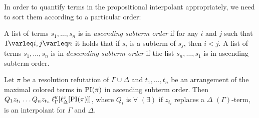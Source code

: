 In order to quantify terms in the propositional interpolant appropriately, we need to sort them according to a particular order:

\begin{defi}
	A list of terms $s_1, \dots, s_n$ is in \emph{ascending subterm order} if for any
	$i$ and $j$ such that  $1\varleq i,j \varleq n$ it holds that if  $s_i$ is a subterm of $s_j$, then $i<j$.
	A list of terms $s_1, \dots, s_n$ is in \emph{descending subterm order} if the list $s_n, \dots, s_1$ is in ascending subterm order.
\end{defi}

\begin{thm}
	\label{thm:two_phases}
	Let $\pi$ be a resolution refutation of $\Gamma \cup \Delta$ and
	$t_1, \dots, t_n$ be an arrangement of the maximal colored terms in $\operatorname{PI}(\pi)$ in ascending subterm order.
	Then
	$Q_1 z_{t_1} \ldots Q_n z_{t_n}\,\ell_{\Gamma}^{y}[\ell_{\Delta}^{x}[\operatorname{PI}(\pi)]]$, where $Q_i$ is $\forall$ $(\exists)$ if $z_{t_i}$ replaces a $\Delta$ $(\Gamma)$-term, is an interpolant for $\Gamma$ and $\Delta$.
\end{thm}
